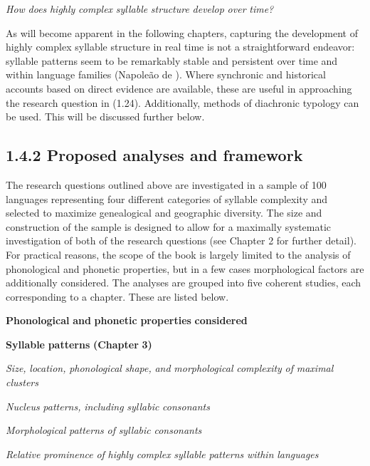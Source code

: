 \ea\label{ex:(1.24)}
   \textit{How} \textit{does} \textit{highly} \textit{complex} \textit{syllable} \textit{structure} \textit{develop} \textit{over} \textit{time?}
\z

  As will become apparent in the following chapters, capturing the development of highly complex syllable structure in real time is not a straightforward endeavor: syllable patterns seem to be remarkably stable and persistent over time and within language families (Napoleão de \citealt{Souza2017}). Where synchronic and historical accounts based on direct evidence are available, these are useful in approaching the research question in (1.24). Additionally, methods of diachronic typology can be used. This will be discussed further below.

\subsection{1.4.2 Proposed analyses and framework}

  The research questions outlined above are investigated in a sample of 100 languages representing four different categories of syllable complexity and selected to maximize genealogical and geographic diversity. The size and construction of the sample is designed to allow for a maximally systematic investigation of both of the research questions (see Chapter 2 for further detail). For practical reasons, the scope of the book is largely limited to the analysis of phonological and phonetic properties, but in a few cases morphological factors are additionally considered. The analyses are grouped into five coherent studies, each corresponding to a chapter. These are listed below.

\ea\label{ex:(1.25)}
  \textbf{Phonological} \textbf{and} \textbf{phonetic} \textbf{properties} \textbf{considered}

\textbf{Syllable} \textbf{patterns} \textbf{(Chapter} \textbf{3)}

\textit{Size,} \textit{location,} \textit{phonological} \textit{shape,} \textit{and} \textit{morphological} \textit{complexity} \textit{of} \textit{maximal} \textit{clusters}

\textit{Nucleus} \textit{patterns,} \textit{including} \textit{syllabic} \textit{consonants}

\textit{Morphological} \textit{patterns} \textit{of} \textit{syllabic} \textit{consonants}

\textit{Relative} \textit{prominence} \textit{of} \textit{highly} \textit{complex} \textit{syllable} \textit{patterns} \textit{within} \textit{languages}

